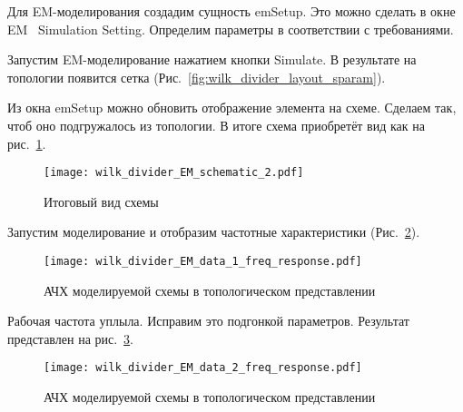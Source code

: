 Для EM-моделирования создадим сущность emSetup.
Это можно сделать в окне EM \textrightarrow\ Simulation Setting.
Определим параметры в соответствии с требованиями.

Запустим EM-моделирование нажатием кнопки Simulate.
В результате на топологии появится сетка (Рис.~\ref{fig:wilk_divider_layout_sparam}).

Из окна emSetup можно обновить отображение элемента на схеме.
Сделаем так, чтоб оно подгружалось из топологии.
В итоге схема приобретёт вид как на рис.~\ref{fig:wilk_divider_EM_schematic_2}.

\begin{figure}[!ht]
    \centering
    \texttt{[image: wilk\_divider\_EM\_schematic\_2.pdf]}
    \caption{Итоговый вид схемы}%
    \label{fig:wilk_divider_EM_schematic_2}
\end{figure}

Запустим моделирование и отобразим частотные характеристики (Рис.~\ref{fig:wilk_divider_EM_data_1_freq_response}).

\begin{figure}[!ht]
    \centering
    \texttt{[image: wilk\_divider\_EM\_data\_1\_freq\_response.pdf]}
    \caption{АЧХ моделируемой схемы в топологическом представлении}%
    \label{fig:wilk_divider_EM_data_1_freq_response}
\end{figure}

Рабочая частота уплыла.
Исправим это подгонкой параметров.
Результат представлен на рис.~\ref{fig:wilk_divider_EM_data_2_freq_response}.

\begin{figure}[!ht]
    \centering
    \texttt{[image: wilk\_divider\_EM\_data\_2\_freq\_response.pdf]}
    \caption{АЧХ моделируемой схемы в топологическом представлении}%
    \label{fig:wilk_divider_EM_data_2_freq_response}
\end{figure}
